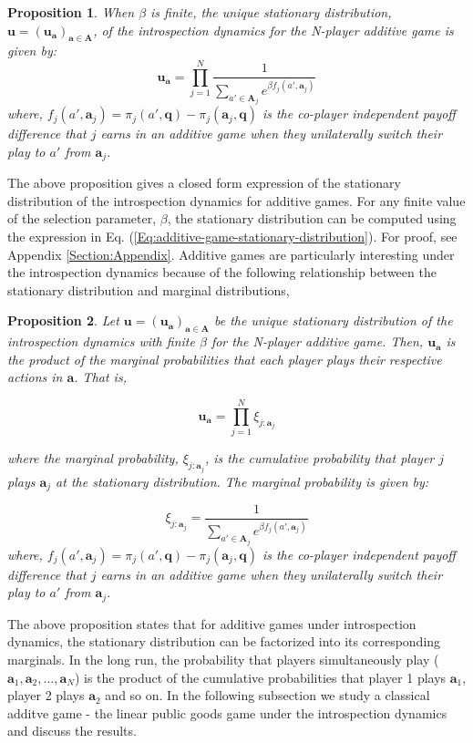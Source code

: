 \documentclass[11pt]{article}
\theoremstyle{plainCl1}
\newtheorem{Prop}{Proposition}
\theoremstyle{plainCl2}
\newcommand{\A}{\mathbf{A}}
\newcommand{\abf}{\mathbf{a}}
\newcommand{\qbf}{\mathbf{q}}
\newcommand{\ubf}{\mathbf{u}}
\begin{document}
 \begin{Prop}
When $\beta$ is finite, the unique stationary distribution, $\ubf = (\ubf_\abf)_{\abf \in \A}$, of the introspection dynamics for the N-player additive game is given by: 
\begin{equation}
\ubf_\abf = \prod_{j=1}^N \frac{1}{\displaystyle \sum_{a' \in \A_j} e^{\beta f_j(a', \abf_j)}} 
\label{Eq:additive-game-stationary-distribution}
\end{equation}
where, $f_j(a', \abf_j) = \pi_j(a', \qbf) - \pi_j(\abf_j, \qbf)$ is the co-player independent payoff difference that $j$  earns in an additive game when they unilaterally switch their play to $a'$ from $\abf_j$.
\label{Th:additive-games-stationary-dist}
\end{Prop}
\noindent The above proposition gives a closed form expression of the stationary distribution of the introspection dynamics for additive games. For any finite value of the selection parameter, $\beta$, the stationary distribution can be computed using the expression in Eq. (\ref{Eq:additive-game-stationary-distribution}). For proof, see Appendix \ref{Section:Appendix}. Additive games are particularly interesting under the introspection dynamics because of the following relationship between the stationary distribution and marginal distributions,


\begin{Prop}
Let $\ubf = (\ubf_\abf)_{\abf \in \A}$ be the unique stationary distribution of the introspection dynamics with finite $\beta$ for the N-player additive game. Then, $\ubf_\abf$ is the product of the marginal probabilities that each player plays their respective actions in $\abf$. That is, 

\begin{equation}
\ubf_\abf = \prod_{j = 1}^N \xi_{j:\abf_j}
\label{Eq:additive-game-products}
\end{equation}

\noindent where the marginal probability, $\xi_{j:\abf_j}$, is the cumulative probability that player $j$ plays $\abf_j$ at the stationary distribution. The marginal probability is given by: 

\begin{equation}
\xi_{j:\abf_j} = \frac{1}{\displaystyle \sum_{a' \in \A_j} e^{\beta f_j(a', \abf_j)}} 
\label{Eq:marginal-at-additive-game}
\end{equation}
\noindent where, $f_j(a', \abf_j) = \pi_j(a', \qbf) - \pi_j(\abf_j, \qbf)$ is the co-player independent payoff difference that $j$  earns in an additive game when they unilaterally switch their play to $a'$ from $\abf_j$.
\label{Th:additive-game-product-of-marginals}
\end{Prop}
\noindent The above proposition states that for additive games under introspection dynamics, the stationary distribution can be factorized into its corresponding marginals. In the long run, the probability that players simultaneously play ($\abf_1, \abf_2, ...,\abf_N$) is the product of the cumulative probabilities that player 1 plays $\abf_1$, player 2 plays $\abf_2$ and so on. In the following subsection we study a classical additve game - the linear public goods game under the introspection dynamics and discuss the results. 
\end{document}
